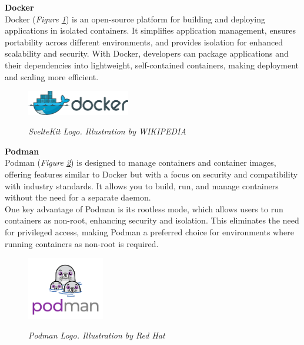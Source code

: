 \vspace{0.5cm}
\textbf{Docker} \\

Docker (\textit{Figure \ref{fig:docker-logo}}) is an open-source platform for building and deploying applications in isolated containers. It simplifies application management, ensures portability across different environments, and provides isolation for enhanced scalability and security. With Docker, developers can package applications and their dependencies into lightweight, self-contained containers, making deployment and scaling more efficient.

\begin{figure}[H]
\centering
\begin{adjustbox}{trim=0cm 0cm, clip}
\includegraphics[width=0.4\textwidth]{imatges/studies_and_decisions/docker-logo.png}
\end{adjustbox}
\caption[SvelteKit Logo]{\textit{SvelteKit Logo. Illustration by WIKIPEDIA}}
{\label{fig:docker-logo}}
\end{figure}


\vspace{0.5cm}
\textbf{Podman} \\

Podman (\textit{Figure \ref{fig:podman-logo}}) is designed to manage containers and container images, offering features similar to Docker but with a focus on security and compatibility with industry standards. It allows you to build, run, and manage containers without the need for a separate daemon. \\

One key advantage of Podman is its rootless mode, which allows users to run containers as non-root, enhancing security and isolation. This eliminates the need for privileged access, making Podman a preferred choice for environments where running containers as non-root is required.

\begin{figure}[H]
\centering
\begin{adjustbox}{trim=0cm 0.25cm, clip}
\includegraphics[width=0.3\textwidth]{imatges/studies_and_decisions/podman-logo.png}
\end{adjustbox}
\caption[Podman Logo]{\textit{Podman Logo. Illustration by Red Hat}}
{\label{fig:podman-logo}}
\end{figure}

